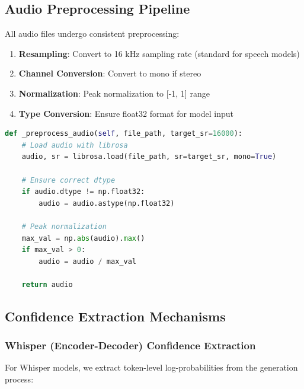 \subsection{Audio Preprocessing Pipeline}

All audio files undergo consistent preprocessing:

\begin{enumerate}
    \item \textbf{Resampling}: Convert to 16 kHz sampling rate (standard for speech models)
    \item \textbf{Channel Conversion}: Convert to mono if stereo
    \item \textbf{Normalization}: Peak normalization to [-1, 1] range
    \item \textbf{Type Conversion}: Ensure float32 format for model input
\end{enumerate}

\begin{lstlisting}[language=Python, caption=Audio Preprocessing]
def _preprocess_audio(self, file_path, target_sr=16000):
    # Load audio with librosa
    audio, sr = librosa.load(file_path, sr=target_sr, mono=True)
    
    # Ensure correct dtype
    if audio.dtype != np.float32:
        audio = audio.astype(np.float32)
    
    # Peak normalization
    max_val = np.abs(audio).max()
    if max_val > 0:
        audio = audio / max_val
    
    return audio
\end{lstlisting}

\subsection{Confidence Extraction Mechanisms}

\subsubsection{Whisper (Encoder-Decoder) Confidence Extraction}

For Whisper models, we extract token-level log-probabilities from the generation process:

